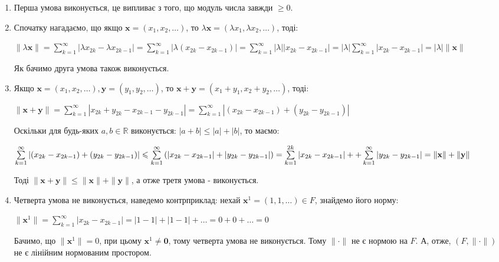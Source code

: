 \documentclass[a5paper, 20pt, titlepage]{article}
\newcommand{\x}{\textbf{x}}
\newcommand{\y}{\textbf{y}}
\begin{document}
\begin{enumerate}
\item Перша умова виконується, це випливає з того, що модуль числа завжди $\geqslant 0$. 

\item  Спочатку нагадаємо, що якщо $\x = (x_1, x_2, \dots)$, то $\lambda \x = (\lambda x_1, \lambda x_2, \dots)$, тоді:

\vspace{3mm}

$\| \lambda \x \| = \sum \limits_{k=1}^{\infty} \left| \lambda x_{2k} - \lambda x_{2k-1} \right| = \sum \limits_{k=1}^{\infty} \left| \lambda(x_{2k} - x_{2k-1}) \right| = \sum \limits_{k=1}^{\infty} |\lambda| |x_{2k} - x_{2k-1}|  = |\lambda| \sum \limits_{k=1}^{\infty} |x_{2k} - x_{2k-1}| = |\lambda| \| \x \|$

Як бачимо друга умова також виконується.

\vspace{3mm}

\item Якщо $\x = (x_1, x_2, \dots), \y = (y_1, y_2, \dots)$, то $\x + \y = (x_1 + y_1, x_2 + y_2, \dots)$, тоді:

$\| \x + \y \| = \sum \limits_{k=1}^{\infty} |x_{2k} + y_{2k} - x_{2k-1} - y_{2k-1}| = \sum \limits_{k=1}^{\infty} \left| (x_{2k} - x_{2k-1}) + (y_{2k} - y_{2k-1}) \right|$

Оскільки для будь-яких $a,b \in \mathbb{R}$ виконується: $|a+b| \leqslant |a| + |b|$, то маємо:

$\sum \limits_{k=1}^{\infty} \left| (x_{2k} - x_{2k-1}) + (y_{2k} - y_{2k-1}) \right| \leqslant \sum \limits_{k = 1}^{\infty} \left( |x_{2k} - x_{2k-1}| +
|y_{2k} - y_{2k-1}| \right) = \sum \limits_{k=1}^{2k} |x_{2k} - x_{2k-1}| + \linebreak + \sum \limits_{k=1}^{\infty} |y_{2k} - y_{2k-1}| = 
\| \x \| + \| \y \|$

\vspace{3mm}

Тоді $\| \x + \y \| \leqslant \| \x \| + \| \y \| $, а отже третя умова - виконується.


\item Четверта умова не виконується, наведемо контрприклад: нехай $\x^1 = (1, 1, \dots) \in F$, знайдемо його норму:

$\| \x^1 \| = \sum \limits_{k=1}^{\infty} |x_{2k} - x_{2k-1}| = |1-1| + |1-1| + \dots = 0 + 0 + \dots = 0$

\vspace{3mm}

Бачимо, що $\| \x^1 \| = 0$, при цьому $\x^1 \neq \textbf{0}$, тому четверта умова не виконується. Тому $ \| \cdot \|$ не є нормою на $F$. А, отже, $(F, \|\cdot \|)$ не є лінійним нормованим простором.
\end{enumerate} 
\end{document}
